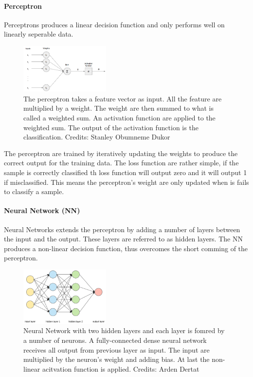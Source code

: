 \paragraph{Perceptron}

Perceptrons produces a linear decision function and only performs well on linearly seperable data. 

\begin{figure}[H]
    \centering
    \includegraphics[width=0.4\textwidth]{figures/perceptron.png}
    \caption[]{The perceptron takes a feature vector as input. All the feature are multiplied by a weight. The weight are then summed to what is called a weighted sum. An activation function are applied to the weighted sum. The output of the activation function is the classification. Credits: Stanley Obumneme Dukor}
    \label{fig:perc}
\end{figure}

The perceptron are trained by iteratively updating the weights to produce the correct output for the training data. The loss function are rather simple, if the sample is correctly classified th loss function will output zero and it will output 1 if misclassified. This means the perceptron's weight are only updated when is fails to classify a sample. 

\paragraph{Neural Network (NN)}

Neural Networks extends the perceptron by adding a number of layers between the input and the output. These layers are referred to as hidden layers. The NN produces a non-linear decision function, thus overcomes the short comming of the perceptron.  

\begin{figure}[H]
    \centering
    \includegraphics[width=0.4\textwidth]{figures/nn.png}
    \caption[]{Neural Network with two hidden layers and each layer is fomred by a number of neurons. A fully-connected dense neural network receives all output from previous layer as input. The input are multiplied by the neuron's weight and adding bias. At last the non-linear acitvation function is applied. Credits: Arden Dertat}
    \label{fig:nn}
\end{figure}

